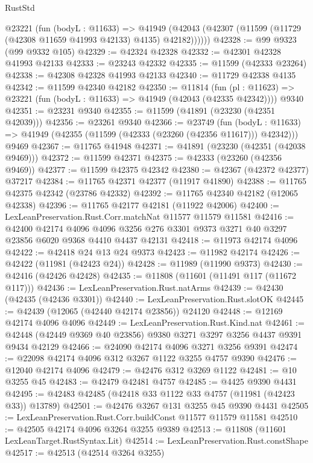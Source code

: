 \begin{lexlean}{RustStd}
\begin{coremodule}
      @23221
        (fun (bodyL : @11633) =>
        @41949 (@42043 (@42307 (@11599 (@11729 (@42308 @11659 @41993 @42133) @4135) @42182))))))
@42328 := @99 @9323 (@99 @9332 @105)
@42329 := @42324 @42328
@42332 := @42301 @42328 @41993 @42133
@42333 := @23243 @42332
@42335 := @11599 (@42333 @23264)
@42338 := @42308 @42328 @41993 @42133
@42340 := @11729 @42338 @4135
@42342 := @11599 @42340 @42182
@42350 := @11814
    (fun (pl : @11623) => @23221 (fun (bodyL : @11633) => @41949 (@42043 (@42335 @42342))))
    @9340
@42351 := @23231 @9340
@42355 := @11599 (@41891 (@23230 (@42351 @42039)))
@42356 := @23261 @9340
@42366 := @23749
    (fun (bodyL : @11633) => @41949 (@42355 (@11599 (@42333 (@23260 (@42356 @11617))) @42342)))
    @9469
@42367 := @11765 @41948
@42371 := @41891 (@23230 (@42351 (@42038 @9469)))
@42372 := @11599 @42371
@42375 := @42333 (@23260 (@42356 @9469))
@42377 := @11599 @42375 @42342
@42380 := @42367 (@42372 @42377) @37217
@42384 := @11765 @42371 @42377 (@11917 @41890)
@42388 := @11765 @42375 @42342 (@23786 @42332)
@42392 := @11765 @42340 @42182 (@12065 @42338)
@42396 := @11765 @42177 @42181 (@11922 @42006)
@42400 := LexLeanPreservation.Rust.Corr.matchNat @11577 @11579 @11581
@42416 := @42400
    @42174
    @4096
    @4096
    @3256
    @276
    @3301
    @9373
    @3271
    @40
    @3297
    @23856
    @6020
    @9368
    @4410
    @4437
    @42131
@42418 := @11973 @42174 @4096
@42422 := @42418 @24 @13 @24 @9373
@42423 := @11982 @42174
@42426 := @42422 (@11981 (@42423 @24))
@42428 := @11989 (@11990 @9373)
@42430 := @42416 (@42426 @42428)
@42435 := @11808 (@11601 (@11491 @117 (@11672 @117)))
@42436 := LexLeanPreservation.Rust.natArms
@42439 := @42430 (@42435 (@42436 @3301))
@42440 := LexLeanPreservation.Rust.slotOK
@42445 := @42439 (@12065 (@42440 @42174 @23856)) @24120
@42448 := @12169 @42174 @4096 @4096
@42449 := LexLeanPreservation.Rust.Kind.nat
@42461 := @42448 (@42449 @9369 @40 @23856) @9380 @3271 @3297 @3256 @4437 @9391 @9434 @42129
@42466 := @24090 @42174 @4096 @3271 @3256 @9391
@42474 := @22098 @42174 @4096 @312 @3267 @1122 @3255 @4757 @9390
@42476 := @12040 @42174 @4096
@42479 := @42476 @312 @3269 @1122
@42481 := @10 @3255 @45
@42483 := @42479 @42481 @4757
@42485 := @4425 @9390 @4431
@42495 := @42483 @42485 (@42418 @33 @1122 @33 @4757 (@11981 (@42423 @33)) @13789)
@42501 := @42476 @3267 @131 @3255 @45 @9390 @4431
@42505 := LexLeanPreservation.Rust.Corr.buildConst @11577 @11579 @11581
@42510 := @42505 @42174 @4096 @3264 @3255 @9389
@42513 := @11808 (@11601 LexLeanTarget.RustSyntax.Lit)
@42514 := LexLeanPreservation.Rust.constShape
@42517 := @42513 (@42514 @3264 @3255)

\end{coremodule}
\end{lexlean}

